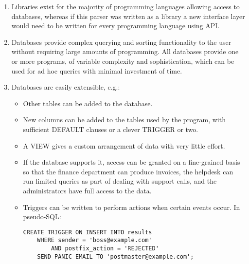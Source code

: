 \documentclass[a4paper,12pt,draft]{article}
\begin{document}
\begin{enumerate}

    \item Libraries exist for the majority of programming languages
        allowing access to databases, whereas if this parser was written
        as a library a new interface layer would need to be written for
        every programming language using API\@.

    \item Databases provide complex querying and sorting functionality to
        the user without requiring large amounts of programming.  All
        databases provide one or more programs, of variable complexity and
        sophistication, which can be used for ad hoc queries with minimal
        investment of time.

    \item Databases are easily extensible, e.g.:
        
        \begin{itemize}

            \item Other tables can be added to the database.

            \item New columns can be added to the tables used by the
                program, with sufficient DEFAULT clauses or a clever
                TRIGGER or two.

            \item A VIEW gives a custom arrangement of data with very
                little effort.

            \item If the database supports it, access can be granted on a
                fine-grained basis so that the finance department can
                produce invoices, the helpdesk can run limited queries as
                part of dealing with support calls, and the administrators
                have full access to the data.

            \item Triggers can be written to perform actions when certain
                events occur.  In pseudo-SQL\@:

\begin{verbatim}
CREATE TRIGGER ON INSERT INTO results
    WHERE sender = 'boss@example.com'
        AND postfix_action = 'REJECTED'
    SEND PANIC EMAIL TO 'postmaster@example.com';
\end{verbatim}

        \end{itemize}

\end{enumerate}
\end{document}
